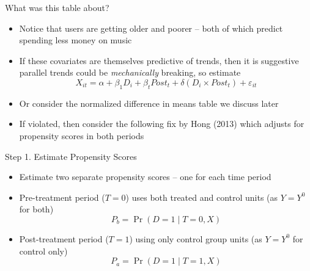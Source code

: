 \documentclass{beamer}
\begin{document}
\begin{frame}{What was this table about?}

\begin{itemize}
\item  Notice that users are getting older and poorer -- both of which predict spending less money on music
\item If these covariates are themselves predictive of trends, then it is suggestive parallel trends could be \emph{mechanically} breaking, so estimate $$X_{it} = \alpha + \beta_1 D_i + \beta_t Post_t + \delta ( D_i \times Post_t ) + \varepsilon_{it}$$
\item Or consider the normalized difference in means table we discuss later
\item If violated, then consider the following fix by Hong (2013) which adjusts for propensity scores in both periods
\end{itemize}

\end{frame}



\begin{frame}{Step 1. Estimate Propensity Scores}
\begin{itemize}
  \item Estimate two separate propensity scores -- one for each time period
  \item Pre-treatment period ($T = 0$) uses both treated and control units (as $Y=Y^0$ for both)
  \begin{equation*}
    P_b = \Pr(D=1 \mid T=0, X)
  \end{equation*}
  \item Post-treatment period ($T = 1$) using only control group units (as $Y=Y^0$ for control only)
  \begin{equation*}
    P_a = \Pr(D=1 \mid T=1, X)
  \end{equation*}
\end{itemize}
\end{frame}
\end{document}
